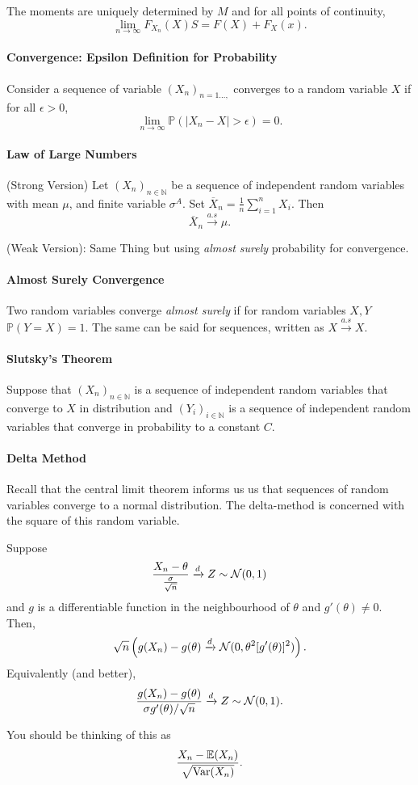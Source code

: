 The moments are uniquely determined by \( M \) and for all
points of continuity,  \[
    \lim_{n \to  \infty} F_{X_n} (X)S = F(X) + F_X(x)
.\]

\paragraph{Convergence: Epsilon Definition for Probability}
Consider a sequence of variable \( (X_n)_{n=1 \ldots,} \) converges
to a random variable \( X \) if for all  \( \epsilon > 0 \), \[
    \lim_{n \to \infty} \mathbb{P}( |X_n - X| > \epsilon ) = 0
.\]

\paragraph{Law of Large Numbers}
(Strong Version) Let \( (X_n)_{n \in \mathbb{N}} \) be a sequence of independent
random variables with mean \( \mu \), and finite variable  \( \sigma^A\).
Set \( \overline{X}_n = \frac{1}{n} \sum_{i=1}^n X_i \).
Then  \[
    \overline{X}_n \xrightarrow{a.s} \mu
.\]

(Weak Version): Same Thing but using \textit{almost surely}
probability for convergence.

\paragraph{Almost Surely Convergence}
Two random variables converge \textit{almost surely} if for
random variables \( X, Y \)
\( \mathbb{P}(Y = X) = 1 \). The same can be said for sequences,
written as \( X \xrightarrow{a.s} X\).

\paragraph{Slutsky's Theorem}
Suppose that \((X_n)_{n \in \mathbb{N}}\) is a sequence of independent random
variables that converge to \(X\) in distribution and
\((Y_i)_{i \in \mathbb{N}}\) is a sequence of independent random variables that
converge in probability to a constant \(C\).


\paragraph{Delta Method}
Recall that the central limit theorem informs us us that sequences of random
variables converge to a normal distribution.
The delta-method is concerned with the square of this random variable.

Suppose \[
    \frac{X_n - \theta}{\frac{\sigma}{\sqrt{n}}} \xrightarrow{d} Z \sim \mathcal{N}(0, 1)
\] 
and \(g\) is a differentiable function in the neighbourhood of \(\theta\)
and \(g'(\theta) \neq 0\).
Then,  \[
    \sqrt{n} \left( g(X_n) - g(\theta) \xrightarrow{d} \mathcal{N}(0, \theta^2 [g'(\theta)]^2) \right) 
.\] 
Equivalently (and better), \[
    \frac{g(X_n) - g(\theta)}{\sigma g'(\theta)/\sqrt{n}}
    \xrightarrow{d} Z \sim \mathcal{N}(0, 1)
.\] 

You should be thinking of this as \[
    \frac{X_n - \mathbb{E}(X_n)}{\sqrt{\mathrm{Var}(X_n)}}
.\] 
